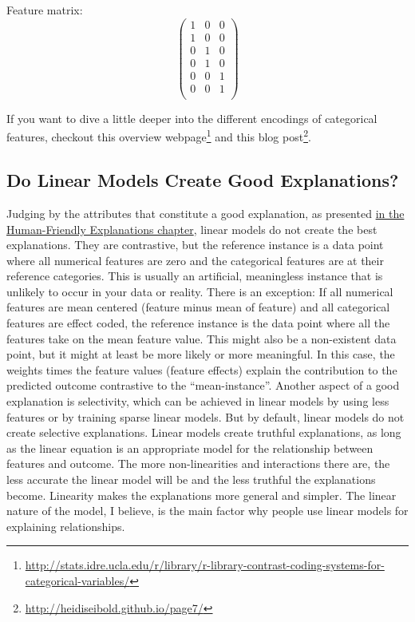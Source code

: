 \documentclass[
  11pt,
]{scrbook}
\renewcommand{\href}[2]{#2\footnote{\url{#1}}}
\begin{document}
Feature matrix: \[\begin{pmatrix}1&0&0\\1&0&0\\0&1&0\\0&1&0\\0&0&1\\0&0&1\\\end{pmatrix}\]

If you want to dive a little deeper into the different encodings of categorical features, checkout \href{http://stats.idre.ucla.edu/r/library/r-library-contrast-coding-systems-for-categorical-variables/}{this overview webpage} and
\href{http://heidiseibold.github.io/page7/}{this blog post}.

\hypertarget{do-linear-models-create-good-explanations}{%
\subsection{Do Linear Models Create Good Explanations?}\label{do-linear-models-create-good-explanations}}

Judging by the attributes that constitute a good explanation, as presented \protect\hyperlink{good-explanation}{in the Human-Friendly Explanations chapter}, linear models do not create the best explanations.
They are contrastive, but the reference instance is a data point where all numerical features are zero and the categorical features are at their reference categories.
This is usually an artificial, meaningless instance that is unlikely to occur in your data or reality.
There is an exception:
If all numerical features are mean centered (feature minus mean of feature) and all categorical features are effect coded, the reference instance is the data point where all the features take on the mean feature value.
This might also be a non-existent data point, but it might at least be more likely or more meaningful.
In this case, the weights times the feature values (feature effects) explain the contribution to the predicted outcome contrastive to the ``mean-instance''.
Another aspect of a good explanation is selectivity, which can be achieved in linear models by using less features or by training sparse linear models.
But by default, linear models do not create selective explanations.
Linear models create truthful explanations, as long as the linear equation is an appropriate model for the relationship between features and outcome.
The more non-linearities and interactions there are, the less accurate the linear model will be and the less truthful the explanations become.
Linearity makes the explanations more general and simpler.
The linear nature of the model, I believe, is the main factor why people use linear models for explaining relationships.
\end{document}
